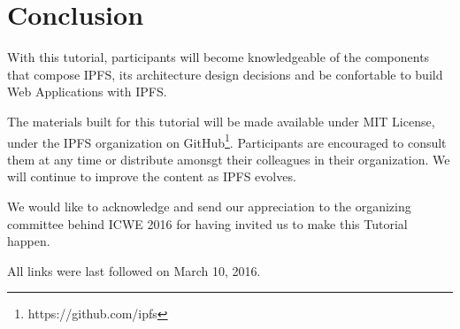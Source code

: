 \documentclass[runningheads,a4paper]{llncs}
\begin{document}

\section{Conclusion}\label{sec:conclusion}

With this tutorial, participants will become knowledgeable of the components that compose IPFS, its architecture design decisions and be confortable to build Web Applications with IPFS\@.

The materials built for this tutorial will be made available under MIT License, under the IPFS organization on GitHub\footnote{https://github.com/ipfs}. Participants are encouraged to consult them at any time or distribute amonsgt their colleagues in their organization. We will continue to improve the content as IPFS evolves.

We would like to acknowledge and send our appreciation to the organizing committee behind ICWE 2016 for having invited us to make this Tutorial happen.





All links were last followed on March 10, 2016.
\end{document}
